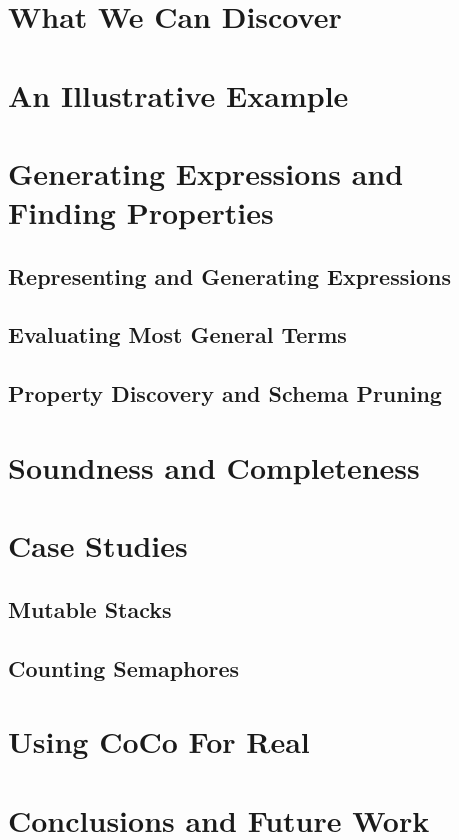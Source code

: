 \blindtext

\section{What We Can Discover}
\label{sec:coco-scope}

\blindtext

\section{An Illustrative Example}
\label{sec:coco-example}

\blindtext

\section{Generating Expressions and Finding Properties}
\label{sec:coco-hiw}

\blindtext

\subsection{Representing and Generating Expressions}
\subsection{Evaluating Most General Terms}
\subsection{Property Discovery and Schema Pruning}

\section{Soundness and Completeness}
\label{sec:coco-correctness}

\blindtext

\section{Case Studies}
\label{sec:coco-casestudies}

\blindtext

\subsection{Mutable Stacks}
\subsection{Counting Semaphores}

\section{Using CoCo For Real}
\label{sec:coco-evaluation}

\blindtext

\section{Conclusions and Future Work}
\label{sec:coco-conclusions}

\blindtext

